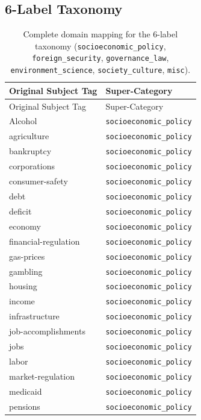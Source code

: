 \subsection{6-Label Taxonomy}
\label{app:domain_mapping_6}

\begin{longtable}{ll}
\caption[Complete domain mapping for the 6-label taxonomy.]{Complete domain mapping for the 6-label taxonomy (\texttt{socioeconomic\_policy}, \texttt{foreign\_security}, \texttt{governance\_law}, \texttt{environment\_science}, \texttt{society\_culture}, \texttt{misc}).}
\label{tab:domain_mapping_6}\\
\toprule
Original Subject Tag & Super-Category \\
\midrule
\endfirsthead
\toprule
Original Subject Tag & Super-Category \\
\midrule
\endhead
\bottomrule
\endfoot
Alcohol & \texttt{socioeconomic\_policy} \\
agriculture & \texttt{socioeconomic\_policy} \\
bankruptcy & \texttt{socioeconomic\_policy} \\
corporations & \texttt{socioeconomic\_policy} \\
consumer-safety & \texttt{socioeconomic\_policy} \\
debt & \texttt{socioeconomic\_policy} \\
deficit & \texttt{socioeconomic\_policy} \\
economy & \texttt{socioeconomic\_policy} \\
financial-regulation & \texttt{socioeconomic\_policy} \\
gas-prices & \texttt{socioeconomic\_policy} \\
gambling & \texttt{socioeconomic\_policy} \\
housing & \texttt{socioeconomic\_policy} \\
income & \texttt{socioeconomic\_policy} \\
infrastructure & \texttt{socioeconomic\_policy} \\
job-accomplishments & \texttt{socioeconomic\_policy} \\
jobs & \texttt{socioeconomic\_policy} \\
labor & \texttt{socioeconomic\_policy} \\
market-regulation & \texttt{socioeconomic\_policy} \\
medicaid & \texttt{socioeconomic\_policy} \\
pensions & \texttt{socioeconomic\_policy} \\

\end{longtable}
